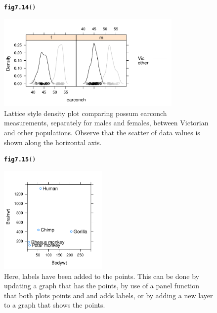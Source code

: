 \documentclass[12pt, a4paper,  BCOR=8.25mm, DIV=15]{scrartcl}\usepackage[]{graphicx}\usepackage[]{color}
\makeatletter
\newcommand{\hlstd}[1]{\textcolor[rgb]{0.345,0.345,0.345}{#1}}%
\newcommand{\hlkwd}[1]{\textcolor[rgb]{0.737,0.353,0.396}{\textbf{#1}}}%
\newenvironment{kframe}{%
 \def\at@end@of@kframe{}%
 \ifinner\ifhmode%
  \def\at@end@of@kframe{\end{minipage}}%
  \begin{minipage}{\columnwidth}%
 \fi\fi%
 \def\FrameCommand##1{\hskip\@totalleftmargin \hskip-\fboxsep
 \colorbox{shadecolor}{##1}\hskip-\fboxsep
     \hskip-\linewidth \hskip-\@totalleftmargin \hskip\columnwidth}%
 \MakeFramed {\advance\hsize-\width
   \@totalleftmargin\z@ \linewidth\hsize
   \@setminipage}}%
 {\par\unskip\endMakeFramed%
 \at@end@of@kframe}
\newenvironment{knitrout}{}{} %
\makeatother
\begin{document}
\begin{figure}[ht]
\begin{knitrout}
\color{fgcolor}\begin{kframe}
\begin{alltt}
\hlkwd{fig7.14}\hlstd{()}
\end{alltt}
\end{kframe}

{\centering \includegraphics[width=0.8\textwidth]{figure/gph-fig7_14e-1} 

}



\end{knitrout}
\caption{Lattice style density plot comparing possum earconch
    measurements, separately for males and females, between Victorian
    and other populations. Observe that the scatter of data values is
shown along the horizontal axis.}\label{fig:possumdens}
\end{figure}

\begin{figure}[ht]
\begin{knitrout}
\color{fgcolor}\begin{kframe}
\begin{alltt}
\hlkwd{fig7.15}\hlstd{()}
\end{alltt}
\end{kframe}

{\centering \includegraphics[width=0.47\textwidth]{figure/gph-fig7_15e-1} 

}



\end{knitrout}
\caption{Here, labels have been added to the points. This can be
  done by updating a graph that has the points, by use of a panel
  function that both plots points and and adds labels, or by adding a
  new layer to a graph that shows the points.}\label{fig:layer}
\end{figure}
\end{document}
